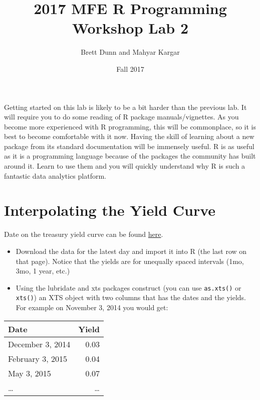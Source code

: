 \documentclass[12pt]{article}
\author{Brett Dunn and Mahyar Kargar}
\date{Fall 2017}
\title{2017 MFE R Programming Workshop Lab 2}
\begin{document}


\maketitle
\onehalfspacing
Getting started on this lab is likely to be a bit harder than the
previous lab. It will require you to do some reading of R package
manuals/vignettes. As you become more experienced with R programming,
this will be commonplace, so it is best to become comfortable with it
now. Having the skill of learning about a new package from its
standard documentation will be immensely useful. R is as useful as it
is a programming language because of the packages the community has
built around it. Learn to use them and you will quickly understand why
R is such a fantastic data analytics platform.

\section*{Interpolating the Yield Curve}
\label{sec-1}
Date on the treasury yield curve can be found \href{http://www.treasury.gov/resource-center/data-chart-center/interest-rates/Pages/TextView.aspx?data=yield}{here}.


\begin{itemize}
\item Download the data for the latest day and import it into R (the last
row on that page). Notice that the yields are for unequally spaced
intervals (1mo, 3mo, 1 year, etc.)
\item Using the lubridate and xts packages construct (you can use \verb~as.xts()~
or \verb~xts()~) an XTS object with two columns that has the dates and
the yields. For example on November 3, 2014 you would get:
\end{itemize}

\begin{center}
\begin{tabular}{lr}
Date & Yield\\
\hline
December 3, 2014 & 0.03\\
February 3, 2015 & 0.04\\
May 3, 2015 & 0.07\\
\ldots{} & \ldots{}\\
\end{tabular}
\end{center}
\end{document}
